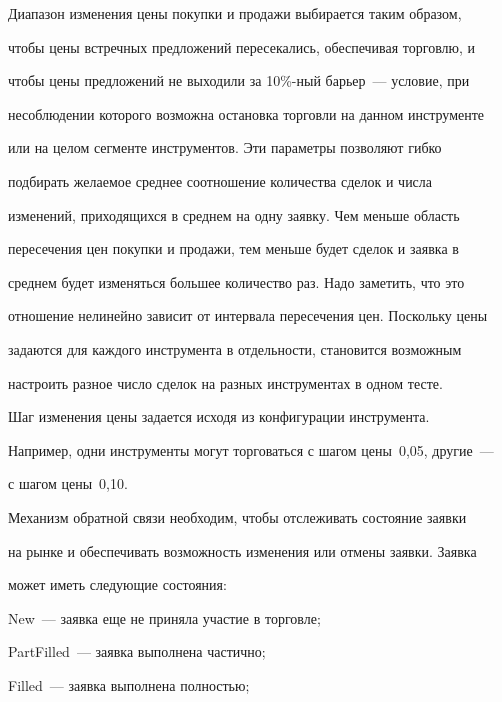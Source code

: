   Диапазон изменения цены покупки и продажи выбирается таким образом,


чтобы цены встречных предложений пересекались, обеспечивая торговлю, и


чтобы цены предложений не выходили за 10\%-ный барьер~--- условие, при


несоблюдении которого возможна остановка торговли на данном инструменте


или на целом сегменте инструментов. Эти параметры позволяют гибко


подбирать желаемое среднее соотношение количества сделок и числа


изменений, приходящихся в среднем на одну заявку. Чем меньше область


пересечения цен покупки и продажи, тем меньше будет сделок и заявка в


среднем будет изменяться большее количество раз. Надо заметить, что это


отношение нелинейно зависит от интервала пересечения цен. Поскольку цены


задаются для каждого инструмента в отдельности, становится возможным


настроить разное число сделок на разных инструментах в одном тесте.





  Шаг изменения цены задается исходя из конфигурации инструмента.


Например, одни инструменты могут торговаться с шагом цены~0,05, другие~---


с шагом цены~0,10.





  Механизм обратной связи необходим, чтобы отслеживать состояние заявки


на рынке и обеспечивать возможность изменения или отмены заявки. Заявка


может иметь сле\-ду\-ющие состояния:





{\sf New}~--- заявка еще не приняла участие в торговле;





{\sf PartFilled}~--- заявка выполнена частично;





{\sf   Filled}~--- заявка выполнена полностью;





